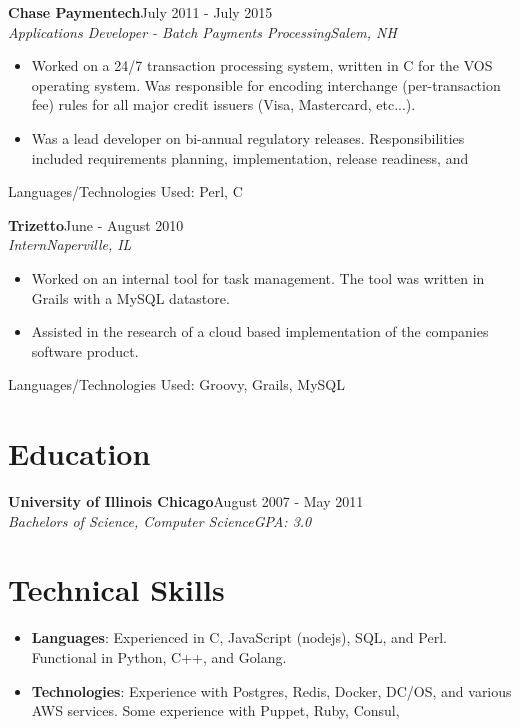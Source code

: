 \documentclass[10pt]{res}
\begin{document}
\begin{resume}
\textbf{Chase Paymentech}\hfill July 2011 - July 2015 \\
{\sl \small{Applications Developer - Batch Payments Processing\hfill Salem, NH}}
  \begin{itemize} \itemsep -1pt %
    \item Worked on a 24/7 transaction processing system, written in C for the VOS operating system. Was responsible for encoding interchange (per-transaction fee) rules for all major credit issuers (Visa, Mastercard, etc...).
    \item Was a lead developer on bi-annual regulatory releases. Responsibilities included requirements planning, implementation, release readiness, and 
  \end{itemize} \vspace{-6pt}
\small{Languages/Technologies Used: Perl, C}

\textbf{Trizetto}\hfill June - August 2010\\
{\sl \small{Intern\hfill Naperville, IL}}
  \begin{itemize} \itemsep -1pt %
    \item Worked on an internal tool for task management. The tool was written in Grails with a MySQL datastore.
    \item Assisted in the research of a cloud based implementation of the companies software product.
  \end{itemize} \vspace{-6pt}
\small{Languages/Technologies Used: Groovy, Grails, MySQL}

\section{\large{Education}}
\vspace{8pt} 
\textbf{University of Illinois Chicago}\hfill August 2007 - May 2011\\
{\sl Bachelors of Science, Computer Science\hfill GPA: 3.0} \\
  
\section{\large{Technical Skills}}
\vspace{16pt}
\begin{itemize} \itemsep -2pt %
  \item \textbf{Languages}: Experienced in C, JavaScript (nodejs), SQL, and Perl. Functional in Python, C++, and Golang.
  \item \textbf{Technologies}: Experience with Postgres, Redis, Docker, DC/OS, and various AWS services. Some experience with Puppet, Ruby, Consul,
\end{itemize}

\end{resume} 
\end{document}
